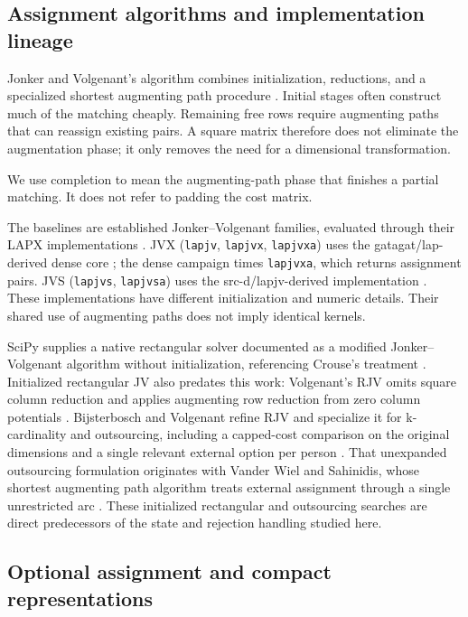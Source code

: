 \documentclass[11pt,a4paper]{article}
\begin{document}
\subsection{Assignment algorithms and implementation lineage}

Jonker and Volgenant's algorithm combines initialization, reductions, and a specialized shortest augmenting path procedure \cite{jonker1987}. Initial stages often construct much of the matching cheaply. Remaining free rows require augmenting paths that can reassign existing pairs. A square matrix therefore does not eliminate the augmentation phase; it only removes the need for a dimensional transformation.

We use completion to mean the augmenting-path phase that finishes a partial matching. It does not refer to padding the cost matrix.

The baselines are established Jonker--Volgenant families, evaluated through their LAPX implementations \cite{lapx2026}. JVX (\texttt{lapjv}, \texttt{lapjvx}, \texttt{lapjvxa}) uses the gatagat/lap-derived dense core \cite{gatagatlap}; the dense campaign times \texttt{lapjvxa}, which returns assignment pairs. JVS (\texttt{lapjvs}, \texttt{lapjvsa}) uses the src-d/lapjv-derived implementation \cite{srcdlapjv}. These implementations have different initialization and numeric details. Their shared use of augmenting paths does not imply identical kernels.

SciPy \cite{virtanen2020scipy} supplies a native rectangular solver documented as a modified Jonker--Volgenant algorithm without initialization, referencing Crouse's treatment \cite{crouse2016,scipylsa}. Initialized rectangular JV also predates this work: Volgenant's RJV omits square column reduction and applies augmenting row reduction from zero column potentials \cite{volgenant1996}. Bijsterbosch and Volgenant refine RJV and specialize it for k-cardinality and outsourcing, including a capped-cost comparison on the original dimensions and a single relevant external option per person \cite{bijsterbosch2010}. That unexpanded outsourcing formulation originates with Vander Wiel and Sahinidis, whose shortest augmenting path algorithm treats external assignment through a single unrestricted arc \cite{vanderwiel1997}. These initialized rectangular and outsourcing searches are direct predecessors of the state and rejection handling studied here.

\subsection{Optional assignment and compact representations}
\end{document}
